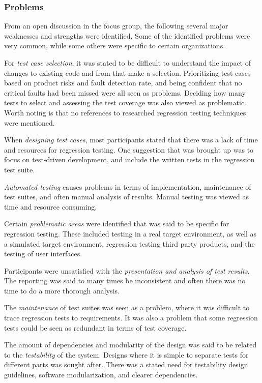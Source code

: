 \documentclass[a4paper,english,12pt]{report}
\begin{document}
\subsubsection{Problems}
From an open discussion in the focus group, the following several major weaknesses and strengths were identified. Some of the identified problems were very common, while some others were specific to certain organizations. \citep[pp. 250-251]{runeson2012regression}

For \textit{test case selection}, it was stated to be difficult to understand the impact of changes to existing code and from that make a selection. Prioritizing test cases based on product risks and fault detection rate, and being confident that no critical faults had been missed were all seen as problems. Deciding how many tests to select and assessing the test coverage was also viewed as problematic. Worth noting is that no references to researched regression testing techniques were mentioned.

When \textit{designing test cases}, most participants stated that there was a lack of time and resources for regression testing. One suggestion that was brought up was to focus on test-driven development, and include the written tests in the regression test suite.

\textit{Automated testing} causes problems in terms of implementation, maintenance of test suites, and often manual analysis of results. Manual testing was viewed as time and resource consuming.

Certain \textit{problematic areas} were identified that was said to be specific for regression testing. These included testing in a real target environment, as well as a simulated target environment, regression testing third party products, and the testing of user interfaces.

Participants were unsatisfied with the \textit{presentation and analysis of test results}. The reporting was said to many times be inconsistent and often there was no time to do a more thorough analysis.

The \textit{maintenance} of test suites was seen as a problem, where it was difficult to trace regression tests to requirements. It was also a problem that some regression tests could be seen as redundant in terms of test coverage.

The amount of dependencies and modularity of the design was said to be related to the \textit{testability} of the system. Designs where it is simple to separate tests for different parts was sought after. There was a stated need for testability design guidelines, software modularization, and clearer dependencies.
\end{document}
